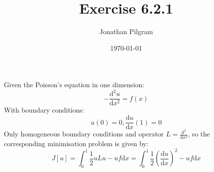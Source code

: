 \documentclass{article}
\title{Exercise 6.2.1}
\author{Jonathan Pilgram}
\date{\today}
\begin{document}
\maketitle

Given the Poisson's equation in one dimension: 
\[
	-\frac{\mathrm{d}^2u}{\mathrm{d}x^2} = f(x)
\] 
With boundary conditions: 
\[
	u(0)=0, \frac{\mathrm{d}u}{\mathrm{d}x} (1) = 0 
\] 
Only homogeneous boundary conditions and operator $L=\frac{\mathrm{d}^2}{\mathrm{d}x^2} $, so the corresponding minimisation problem is given by: 
\[
	J[u] = \int_{0}^{1} \frac{1}{2} uLu-uf \mathrm{d}x= \int_{0}^{1} \frac{1}{2} ( \frac{\mathrm{d}u}{\mathrm{d}x} )^2-uf \mathrm{d}x
\] 
\end{document}
